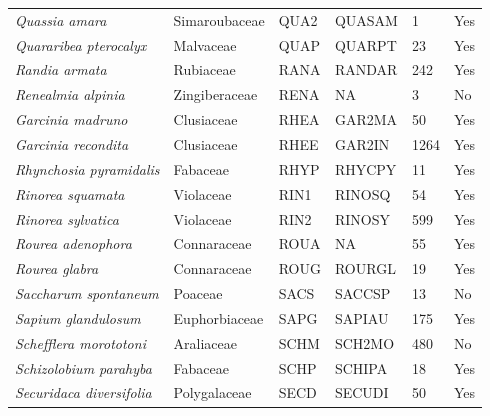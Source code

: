 \documentclass[11pt]{article}
\begin{document}
\begin{longtable}{@{}llllll@{}}
\textit{Quassia amara}                                & Simaroubaceae    & QUA2   & QUASAM & 1               & Yes       \\
\textit{Quararibea pterocalyx}                        & Malvaceae        & QUAP   & QUARPT & 23              & Yes       \\
\textit{Randia armata}                                & Rubiaceae        & RANA   & RANDAR & 242             & Yes       \\
\textit{Renealmia alpinia}                            & Zingiberaceae    & RENA   & NA     & 3               & No        \\
\textit{Garcinia madruno}                             & Clusiaceae       & RHEA   & GAR2MA & 50              & Yes       \\
\textit{Garcinia recondita}                           & Clusiaceae       & RHEE   & GAR2IN & 1264            & Yes       \\
\textit{Rhynchosia pyramidalis}                       & Fabaceae         & RHYP   & RHYCPY & 11              & Yes       \\
\textit{Rinorea squamata}                             & Violaceae        & RIN1   & RINOSQ & 54              & Yes       \\
\textit{Rinorea sylvatica}                            & Violaceae        & RIN2   & RINOSY & 599             & Yes       \\
\textit{Rourea adenophora}                            & Connaraceae      & ROUA   & NA     & 55              & Yes       \\
\textit{Rourea glabra}                                & Connaraceae      & ROUG   & ROURGL & 19              & Yes       \\
\textit{Saccharum spontaneum}                         & Poaceae          & SACS   & SACCSP & 13              & No        \\
\textit{Sapium glandulosum}                           & Euphorbiaceae    & SAPG   & SAPIAU & 175             & Yes       \\
\textit{Schefflera morototoni}                        & Araliaceae       & SCHM   & SCH2MO & 480             & No        \\
\textit{Schizolobium parahyba}                        & Fabaceae         & SCHP   & SCHIPA & 18              & Yes       \\
\textit{Securidaca diversifolia}                      & Polygalaceae     & SECD   & SECUDI & 50              & Yes       \\

\end{longtable}
\end{document}
